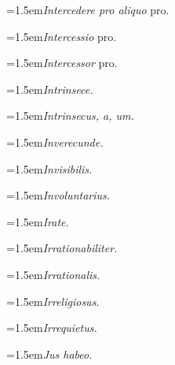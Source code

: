 \par{\dictfontsize\hangindent=1.5em\noindent \textit{Intercedere pro aliquo} pro. \par}
\par{\dictfontsize\hangindent=1.5em\noindent \textit{Intercessio} pro. \par}
\par{\dictfontsize\hangindent=1.5em\noindent \textit{Intercessor} pro. \par}
\par{\dictfontsize\hangindent=1.5em\noindent \textit{Intrinsece.} \par}
\par{\dictfontsize\hangindent=1.5em\noindent \textit{Intrinsecus, a, um.} \par}
\par{\dictfontsize\hangindent=1.5em\noindent \textit{Inverecunde.} \par}
\par{\dictfontsize\hangindent=1.5em\noindent \textit{Invisibilis.} \par}
\par{\dictfontsize\hangindent=1.5em\noindent \textit{Involuntarius.} \par}
\par{\dictfontsize\hangindent=1.5em\noindent \textit{Irate.} \par}
\par{\dictfontsize\hangindent=1.5em\noindent \textit{Irrationabiliter.} \par}
\par{\dictfontsize\hangindent=1.5em\noindent \textit{Irrationalis.} \par}
\par{\dictfontsize\hangindent=1.5em\noindent \textit{Irreligiosus.} \par}
\par{\dictfontsize\hangindent=1.5em\noindent \textit{Irrequietus.} \par}
\par{\dictfontsize\hangindent=1.5em\noindent \textit{Jus habeo.} \par}
